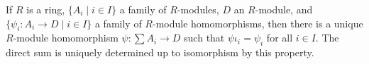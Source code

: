If $R$ is a ring, $\{A_i \mid i \in I\}$ a family of $R$-modules, $D$ an $R$-module, and $\{\psi_i : A_i \to D \mid i \in I\}$ a family of $R$-module homomorphisms, then there is a unique $R$-module homomorphism $\psi : \sum A_i \to D$ such that $\psi \iota_i = \psi_i$ for all $i \in I$. The direct sum is uniquely determined up to isomorphism by this property.
